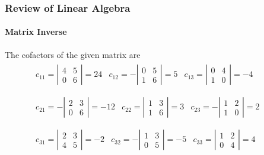 \begin{frame}
\frametitle{Review of Linear Algebra}
\framesubtitle{Matrix Inverse}
\begin{examp}
The cofactors of the given matrix are
\begin{eqnarray*}
\begin{array}{lcr}
c_{11} = \left| \begin{array}{cc} 4 & 5 \\ 0 & 6 \end{array}\right| = 24 &
c_{12} = -\left| \begin{array}{cc} 0 & 5 \\ 1 & 6 \end{array}\right| = 5 &
c_{13} = \left| \begin{array}{cc} 0 & 4 \\ 1 & 0 \end{array}\right| = -4
\end{array}
&& \\
&& \\
\begin{array}{lcr}
c_{21} = -\left| \begin{array}{cc} 2 & 3 \\ 0 & 6 \end{array}\right| = -12 &
c_{22} = \left| \begin{array}{cc} 1 & 3 \\ 1 & 6 \end{array}\right| = 3 &
c_{23} = -\left| \begin{array}{cc} 1 & 2 \\ 1 & 0 \end{array}\right| = 2
\end{array}
&& \\
&& \\
\begin{array}{lcr}
c_{31} = \left| \begin{array}{cc} 2 & 3 \\ 4 & 5 \end{array}\right| = -2 &
c_{32} = -\left| \begin{array}{cc} 1 & 3 \\ 0 & 5 \end{array}\right| = -5 &
c_{33} = \left| \begin{array}{cc} 1 & 2 \\ 0 & 4 \end{array}\right| = 4
\end{array}
\end{eqnarray*}
\end{examp}
\end{frame}
